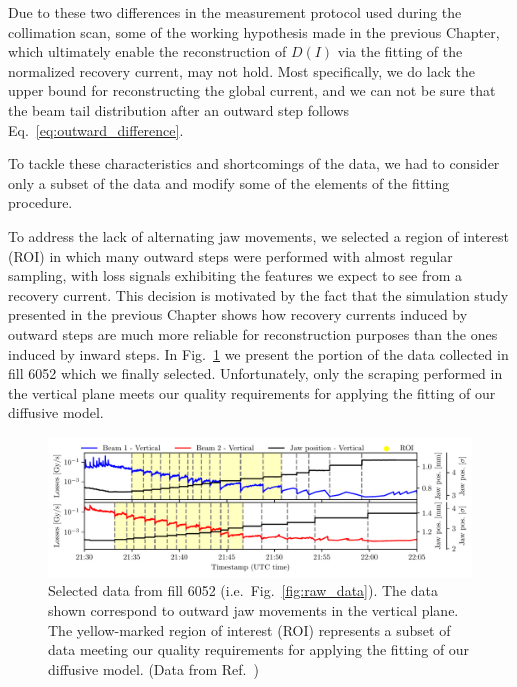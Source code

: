 Due to these two differences in the measurement protocol used during the collimation scan, some of the working hypothesis made in the previous Chapter, which ultimately enable the reconstruction of $D(I)$ via the fitting of the normalized recovery current, may not hold. Most specifically, we do lack the upper bound for reconstructing the global current, and we can not be sure that the beam tail distribution after an outward step follows Eq.~\eqref{eq:outward_difference}.

To tackle these characteristics and shortcomings of the data, we had to consider only a subset of the data and modify some of the elements of the fitting procedure. 

To address the lack of alternating jaw movements, we selected a region of interest (ROI) in which many outward steps were performed with almost regular sampling, with loss signals exhibiting the features we expect to see from a recovery current. This decision is motivated by the fact that the simulation study presented in the previous Chapter shows how recovery currents induced by outward steps are much more reliable for reconstruction purposes than the ones induced by inward steps. In Fig.~\ref{fig:first} we present the portion of the data collected in fill 6052 which we finally selected. Unfortunately, only the scraping performed in the vertical plane meets our quality requirements for applying the fitting of our diffusive model.

\begin{figure}[htp]
    \centering
    \includegraphics[trim={0 2.5mm 0 4mm}, clip, width=\textwidth]{5_Diffusion_measurement_LHC/figs/first.pdf}
    \caption{Selected data from fill 6052 (i.e.\ Fig.~\ref{fig:raw_data}). The data shown correspond to outward jaw movements in the vertical plane. The yellow-marked region of interest (ROI) represents a subset of data meeting our quality requirements for applying the fitting of our diffusive model. (Data from Ref.~\cite{PhysRevAccelBeams.23.044802})}
    \label{fig:first}
\end{figure}


